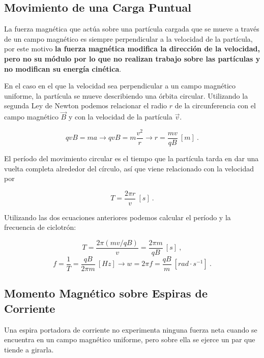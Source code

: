 \documentclass{tufte-handout}
\begin{document}
\subsection{Movimiento de una Carga Puntual}

La fuerza magnética que actúa sobre una partícula cargada que se mueve a través de un campo magnético es siempre perpendicular a la velocidad de la partícula, por este motivo \textbf{la fuerza magnética modifica la dirección de la velocidad, pero no su módulo por lo que no realizan trabajo sobre las partículas y no modifican su energía cinética}.

En el caso en el que la velocidad sea perpendicular a un campo magnético uniforme, la partícula se mueve describiendo una órbita circular. Utilizando la segunda Ley de Newton podemos relacionar el radio $r$ de la circunferencia con el campo magnético $\vec{B}$ y con la velocidad de la partícula $\vec{v}$.

\begin{equation}
qvB = ma \rightarrow qvB = m\frac{v^2}{r} \rightarrow r = \frac{mv}{qB}~[m]~.
\end{equation}

El período del movimiento circular es el tiempo que la partícula tarda en dar una vuelta completa alrededor del círculo, así que viene relacionado con la velocidad por

\begin{equation}
T = \frac{2\pi r}{v}~[s]~.
\end{equation}

Utilizando las dos ecuaciones anteriores podemos calcular el período y la frecuencia de ciclotrón:

\begin{equation}
T = \frac{2\pi(mv/qB)}{v} = \frac{2\pi m}{qB}~[s]~,
\end{equation}
\begin{equation}
f = \frac{1}{T} = \frac{qB}{2\pi m}~[Hz] \rightarrow w = 2\pi f = \frac{qB}{m}~[rad\cdot s^{-1}]~.
\end{equation}

\subsection{Momento Magnético sobre Espiras de Corriente}

Una espira portadora de corriente no experimenta ninguna fuerza neta cuando se encuentra en un campo magnético uniforme, pero sobre ella se ejerce un par que tiende a girarla.
\end{document}
